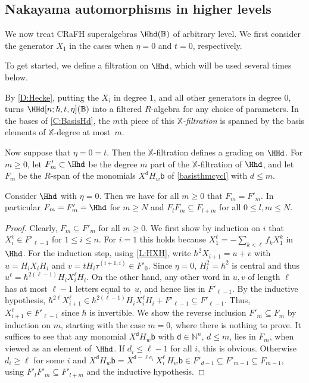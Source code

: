 \documentclass[a4paper,11pt]{amsart}
\numberwithin{equation}{subsection}
\theoremstyle{definition}
\theoremstyle{theorem}
\theoremstyle{remark}
\newcommand\bd{\mathsf{d}}
\newcommand\bb{\mathsf{b}}
\newcommand\N{\mathbb{N}}
\newcommand\X{\mathbb{X}}
\newcommand{\Bo}{\mathbb{B}}
\begin{document}
\subsection{Nakayama automorphisms in higher levels}\label{SS:Xfiltration} We
now treat CRaFH superalgebras $\Hhd(\Bo)$ of arbitrary level.
We first consider the generator $X_1$ in the cases when $\eta=0$ and $t=0$, respectively.

To get started, we define a filtration on $\Hhd$, which will be used
several times below.
\begin{Definition}\label{Xfiltr}
By \autoref{D:Hecke}, putting the $X_i$ in degree
$1$, and all other generators in degree $0$, turns $\HHd[n;\hbar, t,
\eta](\Bo)$ into a filtered $R$-algebra for any choice of parameters.
In the bases of \autoref{C:BasisHd}, the $m$th piece of this
\emph{$\X$-filtration} is spanned by the basis elements of $\X$-degree
at most~$m$.
\end{Definition}
Now suppose that $\eta=0=t$. Then the $\X$-filtration defines a grading
on $\HHd$. For $m\ge0$, let $F_m'\subset \Hhd$ be the degree $m$ part of
the $\X$-filtration of $\Hhd$, and let $F_m$ be the $R$-span of the
monomials $X^\bd H_w\bb$ of \autoref{basisthmcycl} with $d\leq m$.

\begin{Lemma}\label{filtannoying}Consider $\Hhd$ with $\eta=0$.
 Then  we have for all $m\geq 0$ that  $F_m=F'_m$. In  particular $F_m=F_m'=\Hhd$ for $m\geq N$ and $F_lF_m\subseteq F_{l+m}$ for all $0\leq l,m\leq N$.
\end{Lemma}

\begin{proof}
Clearly, $F_m\subseteq F'_m$ for all $m\geq0$. We first show by induction on $i$ that $X_i^{\ell}\in F'_{\ell-1}$ for
$1\leq i\leq n$. For $i=1$ this holds because
$X_1^{\ell}=-\sum_{k<\ell}f_kX_1^{k}$ in $\Hhd$. For the induction step,
using \autoref{L:HXH}, write $\hbar^{2}X_{i+1}=u+v$ with $u=H_iX_iH_i$ and
$v=tH_i\tau^{(i+1,i)}\in F'_0$. Since $\eta=0$, $H_i^2=\hbar^2$ is central and thus
$u^{\ell}=\hbar^{2(\ell-1)}H_iX_i^{\ell}H_i$. On the other hand, any other word in $u,v$ of length $\ell$ has
at most $\ell-1$ letters equal to~$u$, and hence lies in $F'_{\ell-1}$. By the inductive hypothesis,
$\hbar^{2\ell}X_{i+1}^{\ell}\in\hbar^{2(\ell-1)}H_iX_i^{\ell}H_i+F'_{\ell-1}\subseteq F'_{\ell-1}$.
Thus,  $X_{i+1}^{\ell}\in F'_{\ell-1}$ since $\hbar$ is invertible. We
 show the reverse inclusion $F'_m\subseteq F_m$ by induction on $m$,
 starting with the case $m=0$, where there is nothing to prove. It
suffices to see that any monomial $X^\bd H_w\bb$ with $\bd\in\N^{n}$,
$d\leq m$, lies in $F_m$, when viewed as an element of~$\Hhd$. If $d_i\leq\ell-1$ for all $i$, this is obvious. Otherwise $d_i\geq\ell$
for some $i$ and $X^\bd H_w\bb=X^{\bd-\ell e_i}\,X_i^{\ell}\,H_w\bb\in F'_{d-1}\subseteq
F'_{m-1}\subseteq F_{m-1}$, using $F'_lF'_m\subseteq F'_{l+m}$ and the inductive hypothesis.
\end{proof}
\end{document}
